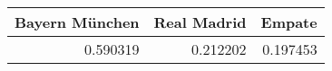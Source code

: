\begin{tabular}{rrr}
\hline
   Bayern München &   Real Madrid &   Empate \\
\hline
         0.590319 &      0.212202 & 0.197453 \\
\hline
\end{tabular}
